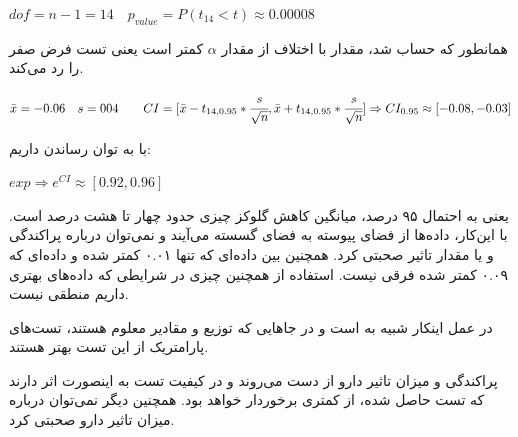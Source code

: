 \documentclass[12pt]{article}
\begin{document}
\begin{latin}
	$
	dof = n - 1 = 14 \quad
	p_{value} = P(t_{14} < t) \approx 0.00008
	$
\end{latin}
همانطور که حساب شد،  مقدار 
با اختلاف از مقدار 
$\alpha$
کمتر است یعنی تست فرض صفر را رد می‌کند.
\begin{latin}
	$
	\bar{x} = -0.06 \quad
	s = 004 \qquad CI = [\bar{x} - t_{14,0.95} * \cfrac{s}{\sqrt{n}}, \bar{x} + t_{14,0.95} * \cfrac{s}{\sqrt{n}}]
	\Rightarrow 
	CI_{0.95} \approx [-0.08, -0.03]
	$
\end{latin}
با به توان رساندن داریم:
\begin{latin}
	$
	exp \Rightarrow e^{CI} \approx [0.92, 0.96]
	$
	
\end{latin}
یعنی به احتمال ۹۵ درصد، میانگین کاهش گلوکز چیزی حدود چهار تا هشت درصد است.
با این‌کار، داده‌ها از فضای پیوسته به فضای گسسته می‌آیند و نمی‌توان درباره پراکندگی و یا مقدار تاثیر صحبتی کرد. همچنین بین داده‌ای که تنها ۰.۰۱ کمتر شده و داده‌ای که ۰.۰۹ کمتر شده فرقی نیست. استفاده از همچنین چیزی در شرایطی که داده‌های بهتری داریم منطقی نیست. 

در عمل اینکار شبیه به 
است و در جاهایی که توزیع و مقادیر معلوم هستند، تست‌های پارامتریک از این تست بهتر هستند.

پراکندگی و میزان تاثیر دارو از دست می‌روند و در کیفیت تست به اینصورت اثر دارند که تست حاصل شده، از
کمتری برخوردار خواهد بود. همچنین دیگر نمی‌توان درباره میزان تاثیر دارو صحبتی کرد.
\end{document}
